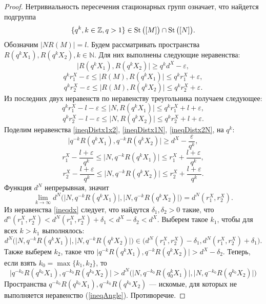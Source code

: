 \begin{proof}
    Нетривиальность пересечения стационарных групп означает, что найдется
    подгруппа \[
        \{q^k, k\in \mathbb{Z}, q> 1\} \in \operatorname{St}\big([M]\big) \cap \operatorname{St}
        \big([N]\big).
    \]
    Обозначим \( |N R(M)| = l \). Будем рассматривать пространства \(
    R(q^k X_1), R(q^k X_2), k \in \mathbb{N} \). Для них выполнены
    следующие неравенства:
    \begin{equation}
        \big| R(q^k X_1), R(q^k X_2) \big| \ge q^k d^X - \varepsilon,
        \label{ineqDistx1x2}
    \end{equation}
    \[
        q^k r_1^X - \varepsilon  \le\big | R(M), R(q^k X_1) \big| \le q^k
        r_1^X + \varepsilon ,
    \]
    \[
        q^k r_2^X - \varepsilon  \le\big | R(M), R(q^k X_2) \big| \le q^k
        r_2^X + \varepsilon .
    \]
    Из последних двух неравенств по неравенству треугольника получаем
    следующее:
    \begin{equation}
        q^k r_1^X - l - \varepsilon \le \big|N, R(q^k X_1) \big| \le
        q^k r_1^X + l + \varepsilon,\label{ineqDistx1N}
    \end{equation}
    \begin{equation}
        q^k r_2^X - l - \varepsilon \le \big|N, R(q^k X_2) \big| \le q^k
        r_2^X + l + \varepsilon.\label{ineqDistx2N}
    \end{equation}
    Поделим неравенства \ref{ineqDistx1x2}, \ref{ineqDistx1N},
    \ref{ineqDistx2N}, на \( q^k \):
    \[ \big| q^{-k}R(q^k X_1), q^{-k}R(q^k X_2) \big| \ge d^X -
    \frac{\varepsilon }{q^k}, \]
    \[
        r_1^X - \frac{l + \varepsilon}{q^k} \le \big|N, q^{-k}R(q^k X_1)
        \big| \le
        r_1^X + \frac{l + \varepsilon}{q^k},
    \]
    \[
        r_2^X - \frac{l + \varepsilon}{q^k} \le \big|N, q^{-k}R(q^k X_2)
        \big| \le
        r_2^X + \frac{l + \varepsilon}{q^k}.
    \]
    Функция \( d^N \) непрерывная, значит
    \[
        \lim_{k \rightarrow \infty
            }d^N\Big(\big|N, q^{-k}R(q^k X_1)
                \big|, \big|N, q^{-k}R(q^k X_2)
            \big|\Big) = d^N(r_1^X, r_2^X).
        \]
        Из неравенства \ref{ineqdx} следует, что найдутся \( \delta
        _1, \delta _2
        > 0 \) такие, что \( d^n(r_1^X,r_2^X)<d^N(r_1^X, r_2^X)+\delta
        _1 < d^X- \delta _2 < d^X \). Выберем такое \( k_1 \), чтобы
        для всех \( k > k_1 \) выполнялось:
        \[
            d^N\Big(\big|N, q^{-k}R(q^k X_1)
                \big|, \big|N, q^{-k}R(q^k X_2)
            \big|\Big) \in \big(d^N(r_1^X, r_2^X)- \delta _1,
        d^N(r_1^X, r_2^X)+ \delta _1\big).  \]
        Также выберем \( k_2 \), такое что \( \big| q^{-k}R(q^k X_1), q^{-k}R(q^k X_2) \big| > d^X - \delta _2 \).
        Теперь, если взять \( k_0 = \max\{k_1,k_2\} \), то
        \[ \big| q^{-k_0}R(q^{k_0} X_1), q^{-k_0}R(q^{k_0} X_2) \big|
            > d^N\Big(\big|N, q^{-k_0}R(q^k_0 X_1) \big|, \big|N,
        q^{-k_0}R(q^{k_0} X_2) \big|\Big) \]
        Пространства \( q^{-k_0}R(q^{k_0}X_1), q^{-k_0}R(q^{k_0}X_2)\)
        ---
        искомые, для которых не выполняется неравенство (\ref{ineqAngle}).
        Противоречие.
    \end{proof}
